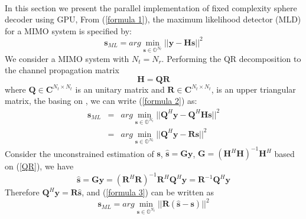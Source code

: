 \documentclass[12pt,a4paper,final]{article}
\begin{document}
\begin{spacing}{2.5}
\paragraph{}In this section we present the parallel implementation of fixed complexity sphere decoder using GPU, From (\ref{formula 1}), the maximum likelihood detector (MLD) for a MIMO system is specified by:
\begin{equation}
\mathbf{s}_{ML}=arg\min_{\mathbf{s}\in \mathbb{O}^{N_{t}}}||\mathbf{y}-\mathbf{H}\mathbf{s}||^{2} \label{formula 2}
\end{equation}
We consider a MIMO system with  $N_{t}=N_{r}$. Performing the QR decomposition to the channel propagation matrix
\begin{equation}
 \mathbf{H}=\mathbf{Q}\mathbf{R}  \label{QR}
\end{equation}
where $\mathbf{Q}\in \mathbf{C}^{N_{t}\times N_{t}}$ is an unitary matrix and $\mathbf{R}\in \mathbf{C}^{N_{t}\times N_{t}}$, is an upper triangular matrix, the basing on \cite{golub2012matrix}, we can write (\ref{formula 2}) as:
\begin{eqnarray}
\nonumber
\mathbf{s}_{ML}&=&arg\min_{\mathbf{s}\in \mathbb{O}^{N_{t}}}||\mathbf{Q}^{H}\mathbf{y}-\mathbf{Q}^{H}\mathbf{H}\mathbf{s}||^{2}\\
&=& arg\min_{\mathbf{s}\in \mathbb{O}^{N_{t}}}||\mathbf{Q}^{H}\mathbf{y}-\mathbf{R}\mathbf{s}||^{2} \label{formula 3}
\end{eqnarray}
Consider the unconstrained estimation of $\mathbf{s}$, $\mathbf{\hat{s}}=\mathbf{G}\mathbf{y}$, $\mathbf{G}=(\mathbf{H}^{H}\mathbf{H})^{-1}\mathbf{H}^{H}$ based on (\ref{QR}), we have  
\begin{equation}
\mathbf{\hat{s}}=\mathbf{G}\mathbf{y}=(\mathbf{R}^{H}\mathbf{R})^{-1}\mathbf{R}^{H}\mathbf{Q}^{H}\mathbf{y}
=\mathbf{R}^{-1}\mathbf{Q}^{H}\mathbf{y}
\label{unconstrained estimation}
\end{equation} 
Therefore $\mathbf{Q}^{H}\mathbf{y}=\mathbf{R}\mathbf{\hat{s}}$, and (\ref{formula 3}) can be written as
\begin{equation}
\mathbf{s}_{ML}=arg\min_{\mathbf{s}\in \mathbb{O}^{N_{t}}}||\mathbf{R}(\mathbf{\hat{s}}-\mathbf{s})||^{2} \label{formula 4}
\end{equation}

\end{spacing}
\end{document}
